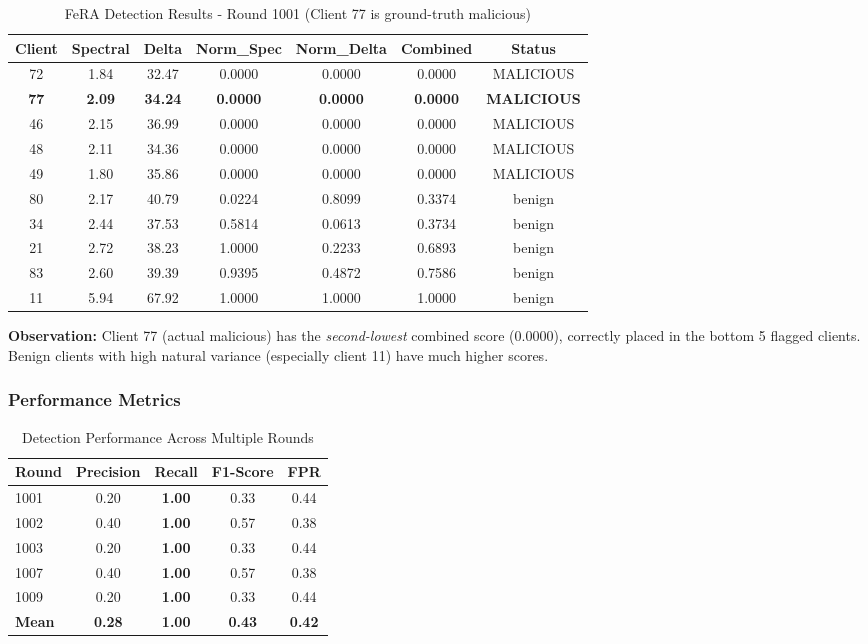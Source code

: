 \documentclass[11pt,a4paper]{article}
\begin{document}
\begin{table}[h]
\centering
\small
\begin{tabular}{@{}ccccccc@{}}
\toprule
\textbf{Client} & \textbf{Spectral} & \textbf{Delta} & \textbf{Norm\_Spec} & \textbf{Norm\_Delta} & \textbf{Combined} & \textbf{Status} \\
\midrule
72 & 1.84 & 32.47 & 0.0000 & 0.0000 & 0.0000 & \color{red}MALICIOUS \\
\textbf{77} & \textbf{2.09} & \textbf{34.24} & \textbf{0.0000} & \textbf{0.0000} & \textbf{0.0000} & \color{red}\textbf{MALICIOUS} \\
46 & 2.15 & 36.99 & 0.0000 & 0.0000 & 0.0000 & \color{red}MALICIOUS \\
48 & 2.11 & 34.36 & 0.0000 & 0.0000 & 0.0000 & \color{red}MALICIOUS \\
49 & 1.80 & 35.86 & 0.0000 & 0.0000 & 0.0000 & \color{red}MALICIOUS \\
\midrule
80 & 2.17 & 40.79 & 0.0224 & 0.8099 & 0.3374 & \color{blue}benign \\
34 & 2.44 & 37.53 & 0.5814 & 0.0613 & 0.3734 & \color{blue}benign \\
21 & 2.72 & 38.23 & 1.0000 & 0.2233 & 0.6893 & \color{blue}benign \\
83 & 2.60 & 39.39 & 0.9395 & 0.4872 & 0.7586 & \color{blue}benign \\
11 & 5.94 & 67.92 & 1.0000 & 1.0000 & 1.0000 & \color{blue}benign \\
\bottomrule
\end{tabular}
\caption{FeRA Detection Results - Round 1001 (Client 77 is ground-truth malicious)}
\label{tab:detection}
\end{table}

\textbf{Observation:} Client 77 (actual malicious) has the \emph{second-lowest} combined score (0.0000), correctly placed in the bottom 5 flagged clients. Benign clients with high natural variance (especially client 11) have much higher scores.

\subsubsection{Performance Metrics}

\begin{table}[h]
\centering
\begin{tabular}{@{}lcccc@{}}
\toprule
\textbf{Round} & \textbf{Precision} & \textbf{Recall} & \textbf{F1-Score} & \textbf{FPR} \\
\midrule
1001 & 0.20 & \textbf{1.00} & 0.33 & 0.44 \\
1002 & 0.40 & \textbf{1.00} & 0.57 & 0.38 \\
1003 & 0.20 & \textbf{1.00} & 0.33 & 0.44 \\
1007 & 0.40 & \textbf{1.00} & 0.57 & 0.38 \\
1009 & 0.20 & \textbf{1.00} & 0.33 & 0.44 \\
\midrule
\textbf{Mean} & \textbf{0.28} & \textbf{1.00} & \textbf{0.43} & \textbf{0.42} \\
\bottomrule
\end{tabular}
\caption{Detection Performance Across Multiple Rounds}
\label{tab:performance}
\end{table}
\end{document}
